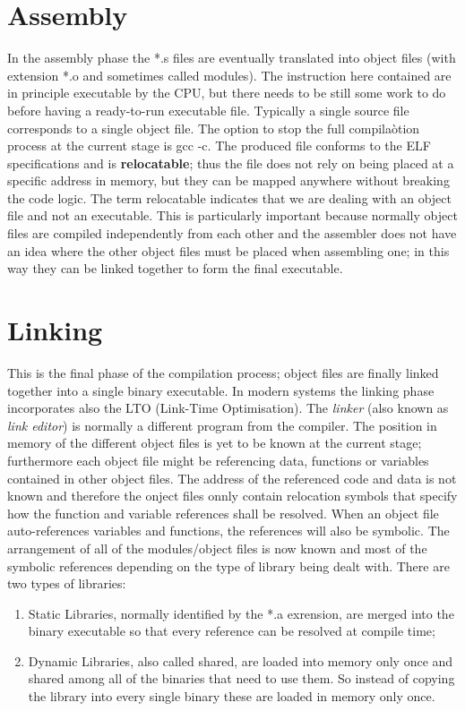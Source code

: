\section{Assembly}
In the assembly phase the *.s files are eventually translated into object files (with extension *.o and sometimes called
modules). The instruction here contained are in principle executable by the CPU, but there needs to be still some work
to do before having a ready-to-run executable file. Typically a single source file corresponds to a single object file.
The option to stop the full compilaòtion process at the current stage is {\ttfamily gcc -c}. The produced file conforms
to the ELF specifications and is \textbf{relocatable}; thus the file does not rely on being placed at a specific address
in memory, but they can be mapped anywhere without breaking the code logic. The term relocatable indicates that we are
dealing with an object file and not an executable. This is particularly important because normally object files are
compiled independently from each other and the assembler does not have an idea where the other object files must be
placed when assembling one; in this way they can be linked together to form the final executable.

\section{Linking}
This is the final phase of the compilation process; object files are finally linked together into a single binary
executable. In modern systems the linking phase incorporates also the LTO (Link-Time Optimisation). The \textit{linker}
(also known as \textit{link editor}) is normally a different program from the compiler. The position in memory of the
different object files is yet to be known at the current stage; furthermore each object file might be referencing data,
functions or variables contained in other object files. The address of the referenced code and data is not known and
therefore the onject files onnly contain relocation symbols that specify how the function and variable references shall
be resolved. When an object file auto-references variables and functions, the references will also be symbolic. The
arrangement of all of the modules/object files is now known and most of the symbolic references depending on the type of
library being dealt with.
There are two types of libraries:
\begin{enumerate}
    \item Static Libraries, normally identified by the *.a exrension, are merged into the binary executable so that
        every reference can be resolved at compile time;
    \item Dynamic Libraries, also called shared, are loaded into memory only once and shared among all of the binaries
        that need to use them. So instead of copying the library into every single binary these are loaded in memory
        only once.
\end{enumerate}
